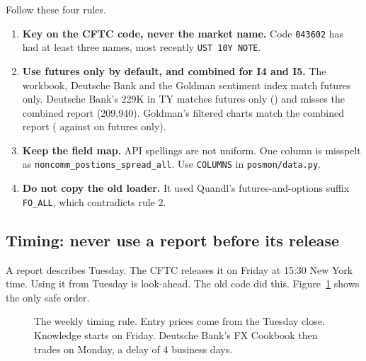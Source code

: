 \documentclass[11pt,a4paper]{article}
\newcommand{\code}[1]{\nolinkurl{#1}}
\begin{document}
Follow these four rules.
\begin{enumerate}
\item \textbf{Key on the CFTC code, never the market name.} Code \code{043602} has had at least three names, most recently \code{UST 10Y NOTE}.
\item \textbf{Use futures only by default, and combined for I4 and I5.} The workbook, Deutsche Bank and the Goldman sentiment index match futures only. Deutsche Bank's 229K in TY matches futures only (\DbTyNet) and misses the combined report (209,940). Goldman's filtered charts match the combined report (\GfChartLev{} against \GfChartLevFut{} on futures only).
\item \textbf{Keep the field map.} API spellings are not uniform. One column is misspelt as \code{noncomm_postions_spread_all}. Use \code{COLUMNS} in \code{posmon/data.py}.
\item \textbf{Do not copy the old loader.} It used Quandl's futures-and-options suffix \code{FO_ALL}, which contradicts rule 2.
\end{enumerate}

\subsection{Timing: never use a report before its release}

A report describes Tuesday. The CFTC releases it on Friday at 15:30 New York time. Using it from Tuesday is look-ahead. The old code did this. Figure~\ref{fig:timing} shows the only safe order.

\begin{figure}[ht]
\centering
{}
\caption{The weekly timing rule. Entry prices come from the Tuesday close. Knowledge starts on Friday. Deutsche Bank's FX Cookbook then trades on Monday, a delay of 4 business days.}
\label{fig:timing}
\end{figure}
\end{document}
